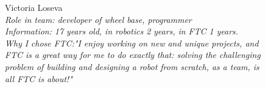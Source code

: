 \begin{figure}[H]	
	\begin{minipage}{0.47\linewidth}
	\end{minipage}
	\hfill
	\begin{minipage}{0.47\linewidth}
		Victoria Loseva\\
		\emph{Role in team: developer of wheel base, programmer\\ }
		\emph{Information: 17 years old, in robotics 2 years, in FTC 1 years. \\} 
		\emph{Why I chose FTC:"I enjoy working on new and unique projects, and FTC is a great way for me to do exactly that: solving the challenging problem of building and designing a robot from scratch, as a team, is all FTC is about!"}			
	\end{minipage}
\end{figure}
\fillpage


